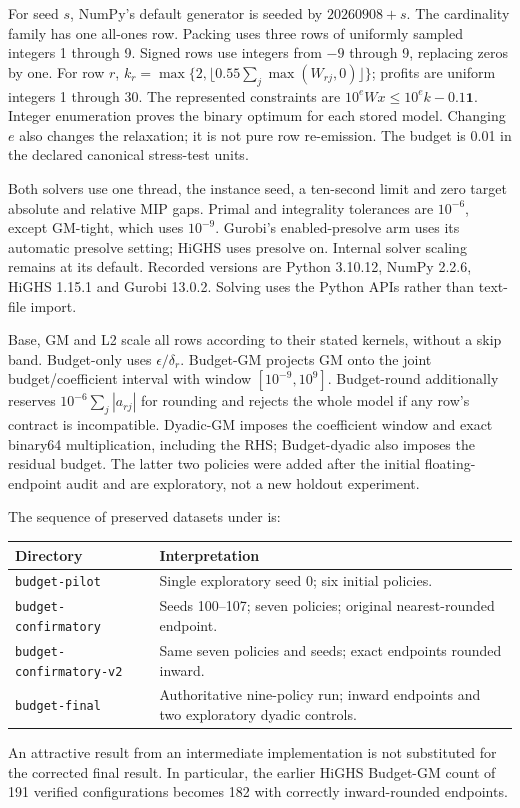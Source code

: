 \documentclass[11pt]{article}
\begin{document}
For seed $s$, NumPy's default generator is seeded by $20260908+s$. The cardinality
family has one all-ones row. Packing uses three rows of uniformly sampled integers
1 through 9. Signed rows use integers from $-9$ through 9, replacing zeros by one.
For row $r$, $k_r=\max\{2,\lfloor0.55\sum_j\max(W_{rj},0)\rfloor\}$; profits
are uniform integers 1 through 30. The represented constraints are
$10^e Wx\le10^e k-0.1\boldsymbol1$. Integer enumeration proves the binary optimum
for each stored model. Changing $e$ also changes the relaxation; it is not pure
row re-emission. The budget is 0.01 in the declared canonical stress-test units.

Both solvers use one thread, the instance seed, a ten-second limit and zero target
absolute and relative MIP gaps. Primal and integrality tolerances are $10^{-6}$,
except GM-tight, which uses $10^{-9}$. Gurobi's enabled-presolve arm uses its automatic
presolve setting; HiGHS uses presolve on. Internal solver scaling remains at its
default. Recorded versions are Python 3.10.12, NumPy 2.2.6, HiGHS 1.15.1 and
Gurobi 13.0.2. Solving uses the Python APIs rather than text-file import.

Base, GM and L2 scale all rows according to their stated kernels, without a skip
band. Budget-only uses $\epsilon/\delta_r$. Budget-GM projects GM onto the joint
budget/coefficient interval with window $[10^{-9},10^9]$. Budget-round additionally
reserves $10^{-6}\sum_j|a_{rj}|$ for rounding and rejects the whole model if any
row's contract is incompatible. Dyadic-GM imposes the coefficient window and exact
binary64 multiplication, including the RHS; Budget-dyadic also imposes the residual
budget. The latter two policies were added after the initial floating-endpoint audit
and are exploratory, not a new holdout experiment.

The sequence of preserved datasets under
 is:
\begin{center}\small
\begin{tabularx}{\linewidth}{lX}
\toprule
Directory & Interpretation\\
\midrule
\texttt{budget-pilot} & Single exploratory seed 0; six initial policies.\\
\texttt{budget-confirmatory} & Seeds 100--107; seven policies; original nearest-rounded endpoint.\\
\texttt{budget-confirmatory-v2} & Same seven policies and seeds; exact endpoints rounded inward.\\
\texttt{budget-final} & Authoritative nine-policy run; inward endpoints and two exploratory dyadic controls.\\
\bottomrule
\end{tabularx}
\end{center}
An attractive result from an intermediate implementation is not substituted for the
corrected final result. In particular, the earlier HiGHS Budget-GM count of 191
verified configurations becomes 182 with correctly inward-rounded endpoints.
\end{document}
